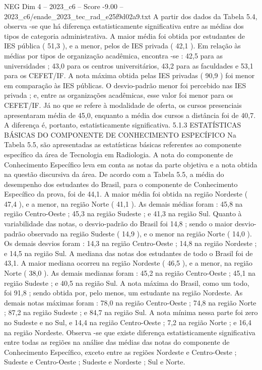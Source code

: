 \begin{textsample}{NEG Dim 4 – 2023\_c6 – Score -9.00 – 2023\_c6/enade\_2023\_tec\_rad\_e25f9d02a9.txt}
A partir dos dados da Tabela 5.4, observa -se que há diferença estatisticamente significativa entre as médias dos tipos de categoria administrativa.
A maior média foi obtida por estudantes de IES pública ( 51,3 ), e a menor, pelos de IES privada ( 42,1 ).
Em relação às médias por tipos de organização acadêmica, encontra -se : 42,5 para as universidades ; 43,0 para os centros universitários, 43,2 para as faculdades e 53,1 para os CEFET/IF.
A nota máxima obtida pelas IES privadas ( 90,9 ) foi menor em comparação às IES públicas.
O desvio-padrão menor foi percebido nas IES privada ; e, entre as organizações acadêmicas, esse valor foi menor para os CEFET/IF.
Já no que se refere à modalidade de oferta, os cursos presenciais apresentaram média de 45,0, enquanto a média dos cursos a distância foi de 40,7.
A diferença é, portanto, estatisticamente significativa. 5.1.3 ESTATÍSTICAS BÁSICAS DO COMPONENTE DE CONHECIMENTO ESPECÍFICO Na Tabela 5.5, são apresentadas as estatísticas básicas referentes ao componente específico da área de Tecnologia em Radiologia.
A nota do componente de Conhecimento Específico leva em conta as notas da parte objetiva e a nota obtida na questão discursiva da área.
De acordo com a Tabela 5.5, a média do desempenho dos estudantes do Brasil, para o componente de Conhecimento Específico da prova, foi de 44,1.
A maior média foi obtida na região Nordeste ( 47,4 ), e a menor, na região Norte ( 41,1 ).
As demais médias foram : 45,8 na região Centro-Oeste ; 45,3 na região Sudeste ; e 41,3 na região Sul.
Quanto à variabilidade das notas, o desvio-padrão do Brasil foi 14,8 ; sendo o maior desvio-padrão observado na região Sudeste ( 14,9 ), e o menor na região Norte ( 14,0 ).
Os demais desvios foram : 14,3 na região Centro-Oeste ; 14,8 na região Nordeste ; e 14,5 na região Sul.
A mediana das notas dos estudantes de todo o Brasil foi de 43,1.
A maior mediana ocorreu na região Nordeste ( 46,5 ), e a menor, na região Norte ( 38,0 ).
As demais medianas foram : 45,2 na região Centro-Oeste ; 45,1 na região Sudeste ; e 40,5 na região Sul.
A nota máxima do Brasil, como um todo, foi 91,8 ; sendo obtida por, pelo menos, um estudante na região Nordeste.
As demais notas máximas foram : 78,0 na região Centro-Oeste ; 74,8 na região Norte ; 87,2 na região Sudeste ; e 84,7 na região Sul.
A nota mínima nessa parte foi zero no Sudeste e no Sul, e 14,4 na região Centro-Oeste ; 7,2 na região Norte ; e 16,4 na região Nordeste.
Observa -se que existe diferença estatisticamente significativa entre todas as regiões na análise das médias das notas do componente de Conhecimento Específico, exceto entre as regiões Nordeste e Centro-Oeste ; Sudeste e Centro-Oeste ; Sudeste e Nordeste ; Sul e Norte.

\end{textsample}
